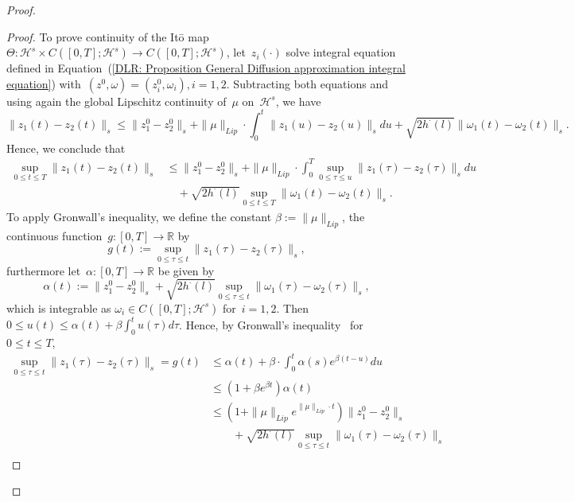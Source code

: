 \begin{proof}
\begin{proof}
    To prove continuity of the It\={o} map~$\Theta : \mathcal{H}^s \times C([0,T]; \mathcal{H}^s) \to  C([0,T]; \mathcal{H}^s)$, let~$z_i (\cdot)$ solve integral equation defined in Equation~(\ref{DLR: Proposition General Diffusion approximation integral equation}) with~$(z^0, \omega) = (z^0_i, \omega_i), i = 1,2$. Subtracting both equations and using again the global Lipschitz continuity of~$\mu$ on~$\mathcal{H}^s$, we have
    \begin{equation*}
     \| z_1(t) - z_2(t) \|_s  \leq  \| z_1^0 - z_2^0 \|_s + \| \mu \|_{Lip} \cdot \int_0^t  \| z_1(u) - z_2(u) \|_s du + \sqrt{2 h^{\cdot}(l)}  \| \omega_1(t) - \omega_2(t) \|_s.
    \end{equation*}
    Hence, we conclude that
    \begin{align*}
      \sup_{0 \leq t \leq T} \| z_1(t) - z_2(t) \|_s &  \leq  \| z_1^0 - z_2^0 \|_s + \| \mu \|_{Lip} \cdot \int_0^T \sup_{0 \leq \tau \leq u}  \| z_1(\tau) - z_2(\tau) \|_s du \\
      & \quad + \sqrt{2 h^{\cdot}(l)} \sup_{0 \leq t \leq T}  \| \omega_1(t) - \omega_2(t) \|_s.
    \end{align*}
    To apply Gronwall's inequality, we define the constant $\beta := \| \mu \|_{Lip} $, the continuous function~$g : [0,T] \to \mathbb{R}$ by
    \begin{equation*}
     g (t) := \sup_{0 \leq \tau \leq t} \| z_1(\tau) - z_2(\tau) \|_s,
    \end{equation*}
    furthermore let~$\alpha: [0,T] \to \mathbb{R}$ be given by
    \begin{equation*}
     \alpha(t) := \| z_1^0 - z_2^0 \|_s + \sqrt{2 h^{\cdot}(l)} \sup_{0 \leq \tau \leq t}  \| \omega_1(\tau) - \omega_2(\tau) \|_s,
    \end{equation*}
    which is integrable as $\omega_i \in  C([0,T]; \mathcal{H}^s)$ for~$i = 1,2$. Then $ 0 \leq u(t) \leq \alpha(t) + \beta  \int_0^t u(\tau)d\tau $. Hence, by Gronwall's inequality~\autocite{Karatzas2000} for $0 \leq t \leq T$,
    \begin{align*}
      \sup_{0 \leq \tau \leq t} \| z_1(\tau) - z_2(\tau) \|_s = g(t) & \leq \alpha(t) + \beta \cdot \int_0^t \alpha(s) e^{\beta (t-u)}du  \\
      & \leq (1+ \beta e^{\beta t}) \alpha(t)\\
      & \leq (1+ \| \mu \|_{Lip} e^{\| \mu \|_{Lip} \cdot t}) \| z_1^0 - z_2^0 \|_s \\
      & \qquad + \sqrt{2 h^{\cdot}(l)} \sup_{0 \leq \tau \leq t}  \| \omega_1(\tau) - \omega_2(\tau) \|_s \\

\end{align*}
\end{proof}
\end{proof}
